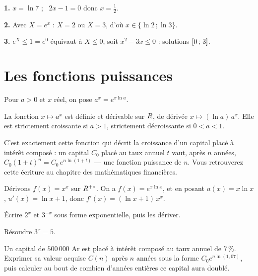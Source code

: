 \begin{corrige}
\textbf{1.} $x = \ln 7$ ; \ $2x-1 = 0$ donc $x = \tfrac12$.

\textbf{2.} Avec $X = e^{x}$ : $X = 2$ ou $X = 3$, d'où
$x \in \{\ln 2\,;\ln 3\}$.

\textbf{3.} $e^{X} \leq 1 = e^{0}$ équivaut à $X \leq 0$, soit
$x^{2}-3x \leq 0$ : solutions $\left[0\,;\,3\right]$.
\end{corrige}

\section{Les fonctions puissances}

\begin{definition}
Pour $a>0$ et $x$ réel, on pose $a^{x} = e^{x\ln a}$.
\end{definition}

\begin{propriete}
La fonction $x \mapsto a^{x}$ est définie et dérivable sur $R$, de dérivée
$x \mapsto (\ln a)\,a^{x}$. Elle est strictement croissante si $a>1$,
strictement décroissante si $0<a<1$.
\end{propriete}

\begin{remarque}
C'est exactement cette fonction qui décrit la croissance d'un capital placé à
intérêt composé : un capital $C_{0}$ placé au taux annuel $t$ vaut, après $n$
années, $C_{0}(1+t)^{n} = C_{0}\,e^{n\ln(1+t)}$ — une fonction puissance de
$n$. Vous retrouverez cette écriture au chapitre des mathématiques
financières.
\end{remarque}

\begin{exemple}
Dérivons $f(x) = x^{x}$ sur $R^{+*}$. On a $f(x) = e^{x\ln x}$, et en posant
$u(x) = x\ln x$, $u'(x) = \ln x + 1$, donc
$f'(x) = (\ln x + 1)\,x^{x}$.
\end{exemple}

\begin{entrainement}
\exo[\niveau{1}] Écrire $2^{x}$ et $3^{-x}$ sous forme exponentielle, puis les
dériver.

\exo[\niveau{2}] Résoudre $3^{x} = 5$.

\exo[\niveau{2}] Un capital de $500\,000$ Ar est placé à intérêt composé au
taux annuel de $7\,\%$. Exprimer sa valeur acquise $C(n)$ après $n$ années
sous la forme $C_{0}e^{n\ln(1{,}07)}$, puis calculer au bout de combien
d'années entières ce capital aura doublé.
\end{entrainement}

